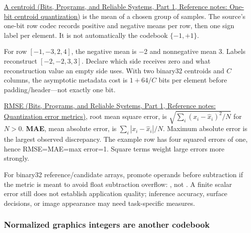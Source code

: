 \hypertarget{05-engine-i-ch001-a-one-bit-label-can-select-two-learned-reconstruction-values}{}

\href{../01-Bits-Programs-and-Reliable-Systems-P01/main.pdf\#nameddest=appendix-4ccd7a775813}{A centroid (Bits, Programs, and Reliable Systems, Part 1, Reference notes: One-bit centroid quantization)} is the mean of a chosen group of samples. The source's one-bit row codec records positive and negative means per row, then one sign label per element. It is not automatically the codebook \(\{-1,+1\}\).

For row \([-1,-3,2,4]\), the negative mean is −2 and nonnegative mean 3. Labels  reconstruct \([-2,-2,3,3]\). Declare which side receives zero and what reconstruction value an empty side uses. With two binary32 centroids and \(C\) columns, the asymptotic metadata cost is \(1+64/C\) bits per element before padding/header---not exactly one bit.

\href{../01-Bits-Programs-and-Reliable-Systems-P01/main.pdf\#nameddest=appendix-537171d69d27}{RMSE (Bits, Programs, and Reliable Systems, Part 1, Reference notes: Quantization error metrics)}, root mean square error, is \(\sqrt{\sum_i(x_i-\widehat x_i)^2/N}\) for \(N>0\). \textbf{MAE}, mean absolute error, is \(\sum_i|x_i-\widehat x_i|/N\). Maximum absolute error is the largest observed discrepancy. The example row has four squared errors of one, hence RMSE=MAE=max error=1. Square terms weight large errors more strongly.

For binary32 reference/candidate arrays, promote operands before subtraction if the metric is meant to avoid float subtraction overflow: , not . A finite scalar error still does not establish application quality; inference accuracy, surface decisions, or image appearance may need task-specific measures.

\subsubsection{Normalized graphics integers are another codebook}\label{05-engine-i-ch001-normalized-graphics-integers-are-another-codebook}

\hypertarget{05-engine-i-ch001-normalized-graphics-integers-are-another-codebook}{}

